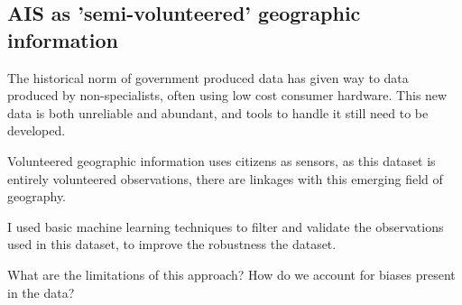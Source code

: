 \subsection{AIS as 'semi-volunteered' geographic information}

The historical norm of government produced data has given way to data produced by non-specialists, often using low cost consumer hardware. This new data is both unreliable and abundant, and tools to handle it still need to be developed.

Volunteered geographic information uses citizens as sensors, as this dataset is entirely volunteered observations, there are linkages with this emerging field of geography.

I used basic machine learning techniques to filter and validate the observations used in this dataset, to improve the robustness the dataset.







What are the limitations of this approach? How do we account for biases present in the data?
